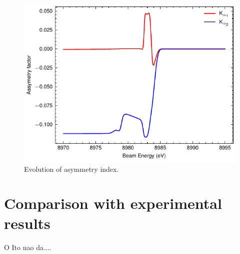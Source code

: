\begin{figure}
    \centering
    \includegraphics[width=.6\linewidth]{Chapters/Figures/Chapter5/assym_index.pdf}
    \caption{Evolution of asymmetry index.}\label{fig:index}
\end{figure}

\section{Comparison with experimental results}

O Ito nao da....